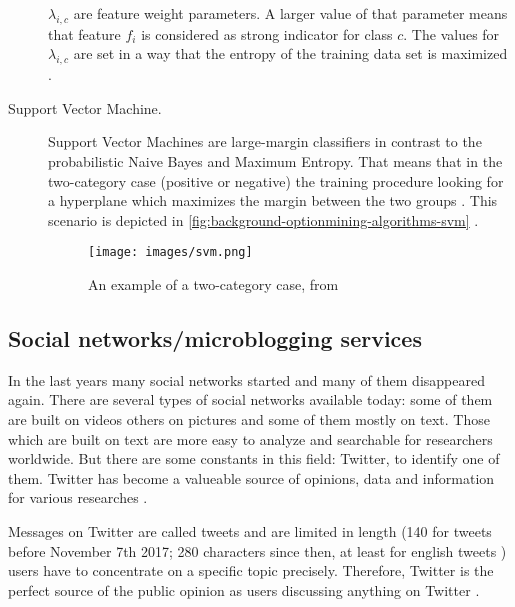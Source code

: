 \begin{description}
  $\lambda_{i,c}$ are feature weight parameters. A larger value of that parameter means that feature $f_i$ is considered as strong indicator for class $c$.
  The values for $\lambda_{i,c}$ are set in a way that the entropy of the training data set is maximized \cite{Pang2002}.
  	
	\item[Support Vector Machine.]
   Support Vector Machines are large-margin classifiers in contrast to the probabilistic Naive Bayes and Maximum Entropy.
   That means that in the two-category case (positive or negative) the training procedure looking for a hyperplane which maximizes the margin between the two groups \cite{Pang2002}.
   This scenario is depicted in \autoref{fig:background-optionmining-algorithms-svm} \cite[p. 275]{Cortes1995}.
      
   \begin{figure}[ht]
    \centering
    \texttt{[image: images/svm.png]}
    \caption{An example of a two-category case, from \cite[p. 275]{Cortes1995}}
    \label{fig:background-optionmining-algorithms-svm}
  \end{figure}
	
\end{description}




\subsection{Social networks/microblogging services}
\label{ss:background-socialnetworks}

In the last years many social networks started and many of them disappeared again.
There are several types of social networks available today: some of them are built on videos others on pictures and some of them mostly on text.
Those which are built on text are more easy to analyze and searchable for researchers worldwide.
But there are some constants in this field: Twitter, to identify one of them.
Twitter has become a valueable source of opinions, data and information for various researches \cite{Barbosa2010}.

Messages on Twitter are called tweets and are limited in length (140 for tweets before November 7th 2017; 280 characters since then, at least for english tweets \cite{Rosen2017TweetingEasier}) users have to concentrate on a specific topic precisely.
Therefore, Twitter is the perfect source of the public opinion as users discussing anything on Twitter \cite{Pagolu2016a}.

